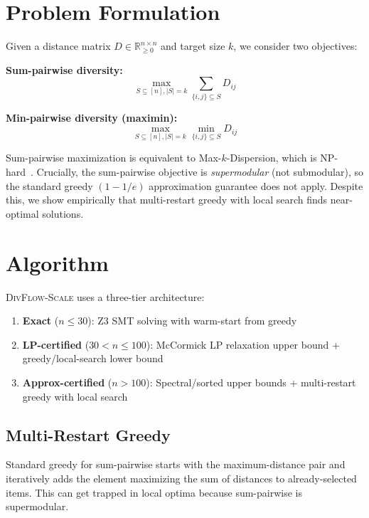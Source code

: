 \documentclass[11pt,a4paper]{article}
\begin{document}
\section{Problem Formulation}

Given a distance matrix $D \in \mathbb{R}^{n \times n}_{\geq 0}$ and target size $k$, we consider two objectives:

\textbf{Sum-pairwise diversity:}
\begin{equation}
    \max_{S \subseteq [n], |S|=k} \sum_{\{i,j\} \subseteq S} D_{ij}
\end{equation}

\textbf{Min-pairwise diversity (maximin):}
\begin{equation}
    \max_{S \subseteq [n], |S|=k} \min_{\{i,j\} \subseteq S} D_{ij}
\end{equation}

Sum-pairwise maximization is equivalent to Max-$k$-Dispersion, which is NP-hard~\cite{ravi1994heuristic}. Crucially, the sum-pairwise objective is \emph{supermodular} (not submodular), so the standard greedy $(1-1/e)$ approximation guarantee does not apply. Despite this, we show empirically that multi-restart greedy with local search finds near-optimal solutions.

\section{Algorithm}

\textsc{DivFlow-Scale} uses a three-tier architecture:

\begin{enumerate}
    \item \textbf{Exact} ($n \leq 30$): Z3 SMT solving with warm-start from greedy
    \item \textbf{LP-certified} ($30 < n \leq 100$): McCormick LP relaxation upper bound + greedy/local-search lower bound
    \item \textbf{Approx-certified} ($n > 100$): Spectral/sorted upper bounds + multi-restart greedy with local search
\end{enumerate}

\subsection{Multi-Restart Greedy}

Standard greedy for sum-pairwise starts with the maximum-distance pair and iteratively adds the element maximizing the sum of distances to already-selected items. This can get trapped in local optima because sum-pairwise is supermodular.
\end{document}
